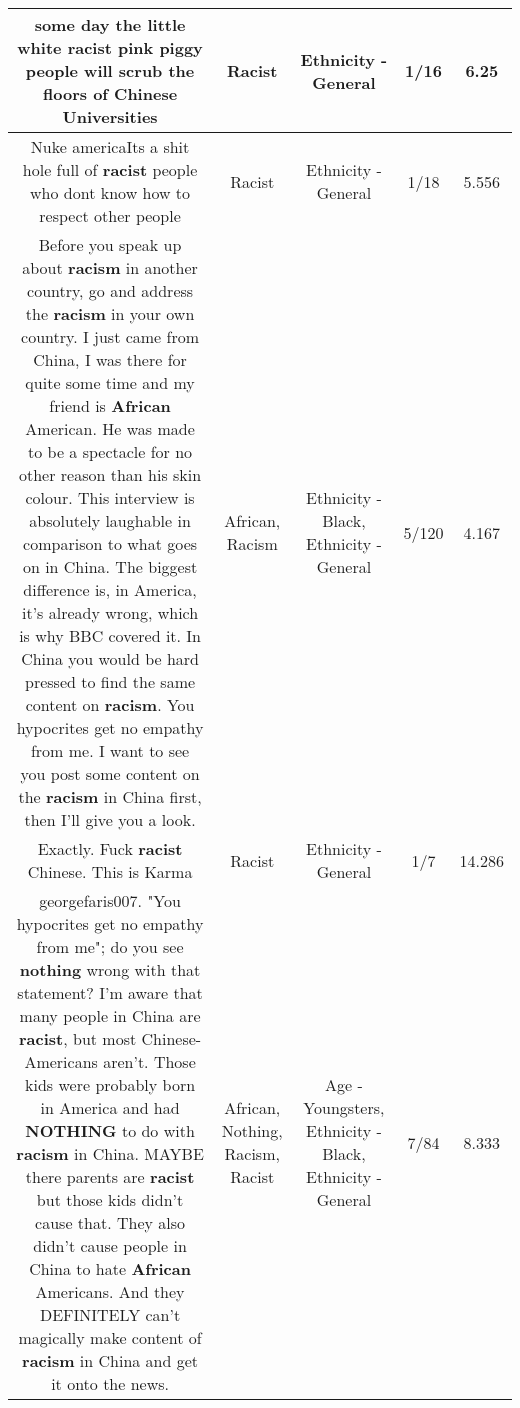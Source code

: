 \documentclass[11pt]{article}
\newlength\mylength
\begin{document}
\begin{center}
\begin{longtable}{|C{.65\mylength}|C{.30\mylength}|C{.12\mylength}|C{.12\mylength}|C{.12\mylength}|}
  \small some day the little white \textbf{racist} pink piggy people will scrub the floors of Chinese Universities\normalsize   & Racist & Ethnicity - General & 1/16 & 6.25 \\  \hline
  \small Nuke americaIts a shit hole full of \textbf{racist} people who dont know how to respect other people\normalsize   & Racist & Ethnicity - General & 1/18 & 5.556 \\  \hline
  \small Before you speak up about \textbf{racism} in another country, go and address the \textbf{racism} in your own country. I just came from China, I was there for quite some time and my friend is \textbf{African} American. He was made to be a spectacle for no other reason than his skin colour. This interview is absolutely laughable in comparison to what goes on in China. The biggest difference is, in America, it's already wrong, which is why BBC covered it. In China you would be hard pressed to find the same content on \textbf{racism}. You hypocrites get no empathy from me. I want to see you post some content on the \textbf{racism} in China first, then I'll give you a look.\normalsize   & African, Racism & Ethnicity - Black, Ethnicity - General & 5/120 & 4.167 \\  \hline
  \small Exactly.  Fuck \textbf{racist} Chinese.  This is Karma\normalsize   & Racist & Ethnicity - General & 1/7 & 14.286 \\  \hline
  \small georgefaris007. "You hypocrites get no empathy from me"; do you see \textbf{nothing} wrong with that statement? I'm aware that many people in China are \textbf{racist}, but most Chinese-Americans aren't. Those kids were probably born in America and had \textbf{NOTHING} to do with \textbf{racism} in China. MAYBE there parents are \textbf{racist} but those kids didn't cause that. They also didn't cause people in China to hate \textbf{African} Americans. And they DEFINITELY can't magically make content of \textbf{racism} in China and get it onto the news.\normalsize   & African, Nothing, Racism, Racist & Age - Youngsters, Ethnicity - Black, Ethnicity - General & 7/84 & 8.333 \\  \hline

\end{longtable}
\end{center}
\end{document}
